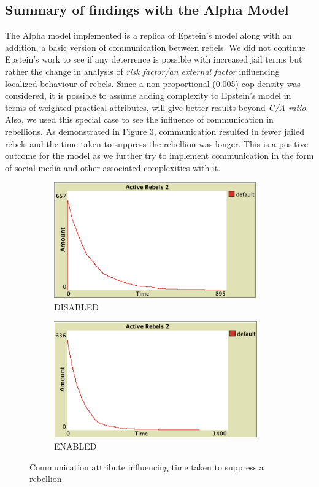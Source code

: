 \documentclass[a4paper,11pt]{article}
\begin{document}
\subsection{Summary of findings with the Alpha Model}
The Alpha model implemented is a replica of Epstein's model \cite{epstein2002modeling} along with an addition, a basic version of communication between rebels. We did not continue Epstein's work to see if any deterrence is possible with increased jail terms but rather the change in analysis of \textit{risk factor/an external factor} influencing localized behaviour of rebels. Since a non-proportional (0.005) cop density was considered, it is possible to assume adding complexity to Epstein’s model in terms of weighted practical attributes, will give better results beyond \textit{C/A ratio}. Also, we used this special case to see the influence of communication in rebellions. As demonstrated in Figure \ref{fig:fig4}, communication resulted in fewer jailed rebels and the time taken to suppress the rebellion was longer. This is a positive outcome for the model as we further try to implement communication in the form of social media and other associated complexities with it. 

\begin{figure}[h]

\begin{subfigure}{0.5\textwidth}
\includegraphics[width=0.9\linewidth, height=5cm]{TIME_COMM_OFF.png} 
\caption{DISABLED}
\label{fig:subim1}
\end{subfigure}
\begin{subfigure}{0.5\textwidth}
\includegraphics[width=0.9\linewidth, height=5cm]{TIME_COMM_ON.png}
\caption{ENABLED}
\label{fig:subim2}
\end{subfigure}

\caption{Communication attribute influencing time taken to suppress a rebellion}
\label{fig:fig4}
\end{figure}
\end{document}
